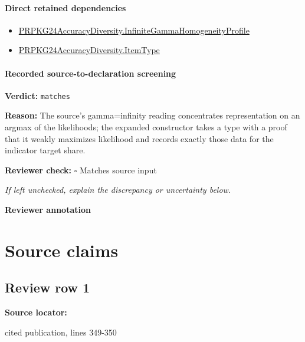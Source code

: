 \documentclass[10pt]{article}
\newcommand{\reviewerbox}{%
  \par\noindent\fbox{\parbox{0.96\linewidth}{\rule{0pt}{0.38in}}}\par
}
\newcommand{\reviewmatch}[1]{%
  \par\noindent\textbf{Reviewer check:} $\square$\; #1\par
  \noindent\emph{If left unchecked, explain the discrepancy or uncertainty below.}\par
}
\begin{document}
\paragraph{Direct retained dependencies}
\begin{itemize}\raggedright
\item \hyperlink{governing-declaration-b9de13875ac7b5e2}{PRPKG24\allowbreak{}Accuracy\allowbreak{}Diversity.\allowbreak{}Infinite\allowbreak{}Gamma\allowbreak{}Homogeneity\allowbreak{}Profile}
\item \hyperlink{governing-declaration-562ef32e180a12be}{PRPKG24\allowbreak{}Accuracy\allowbreak{}Diversity.\allowbreak{}Item\allowbreak{}Type}
\end{itemize}
\paragraph{Recorded source-to-declaration screening}
\textbf{Verdict:} \texttt{matches}
\\
{\raggedright
\textbf{Reason:} The source's gamma=infinity reading concentrates representation on an argmax of the likelihoods;\allowbreak{} the expanded constructor takes a type with a proof that it weakly maximizes likelihood and records exactly those data for the indicator target share.\allowbreak{}
\par}
\reviewmatch{Matches source input}
\noindent\textbf{Reviewer annotation}\par
\reviewerbox

\clearpage
\hypertarget{source-claim-f5a7e9fe26a022aa}{}
\hypertarget{source-section-f10b5f68e4acf3dc}{}
\section*{Source claims}
\subsection*{Review row 1}
\textbf{Source locator:} {\footnotesize\raggedright cited publication, lines 349-\allowbreak{}350\par}
\end{document}
